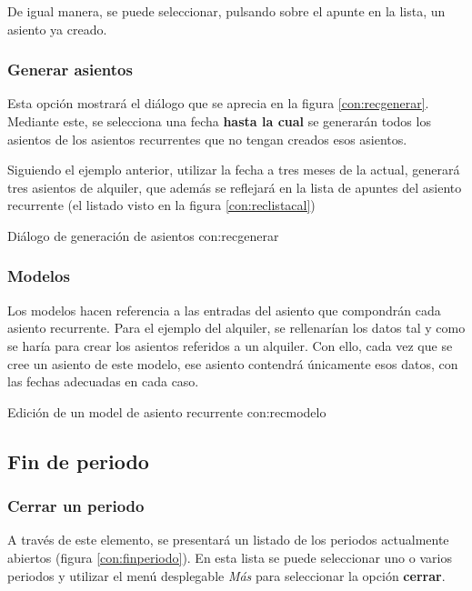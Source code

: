 De igual manera, se puede seleccionar, pulsando sobre el apunte en la lista, un asiento ya creado.


\subsubsection{Generar asientos}

Esta opción mostrará el diálogo que se aprecia en la figura \ref{con:recgenerar}. Mediante este, se selecciona una fecha \textbf{hasta la cual} se generarán todos los asientos de los asientos recurrentes que no tengan creados esos asientos. 

Siguiendo el ejemplo anterior, utilizar la fecha a tres meses de la actual, generará tres asientos de alquiler, que además se reflejará en la lista de apuntes del asiento recurrente (el listado visto en la figura \ref{con:reclistacal})

{Diálogo de generación de asientos}
{con:recgenerar}


\subsubsection{Modelos}

Los modelos hacen referencia a las entradas del asiento que compondrán cada asiento recurrente. Para el ejemplo del alquiler, se rellenarían los datos tal y como se haría para crear los asientos referidos a un alquiler. Con ello, cada vez que se cree un asiento de este modelo, ese asiento contendrá únicamente esos datos, con las fechas adecuadas en cada caso.


{Edición de un model de asiento recurrente}
{con:recmodelo}




\subsection{Fin de periodo}

\subsubsection{Cerrar un periodo}
A través de este elemento, se presentará un listado de los periodos actualmente abiertos (figura \ref{con:finperiodo}). En esta lista se puede seleccionar uno o varios periodos y utilizar el menú desplegable \emph{Más} para seleccionar la opción \textbf{cerrar}.

